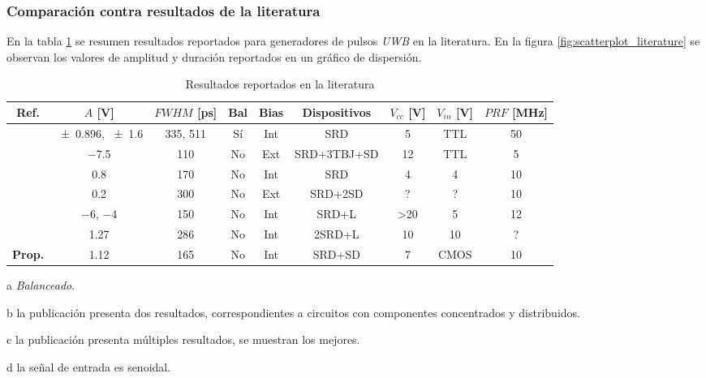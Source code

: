 \subsubsection{Comparación contra resultados de la literatura}

En la tabla \ref{tab:resultados_literatura} se resumen resultados reportados
para generadores de pulsos \textit{UWB} en la literatura. En la figura
\ref{fig:scatterplot_literature} se observan los valores de amplitud y duración
reportados en un gráfico de dispersión.

\begin{table}[t!]
    \begin{threeparttable}[b]
        {\footnotesize
            \begin{tabular}{ccccccccc}
                \hline
                Ref. & $A$ [\unit{\volt}] & $FWHM$ [\unit{\pico\second}] &
                Bal \tnote{a} & Bias & Dispositivos & $V_{cc}$ [\unit{\volt}] & $V_{in}$ [\unit{\volt}] & $PRF$ [\unit{\mega\hertz}] \\
                \hline
                \cite{rulikowski2004} & \num{\pm 0.896}, \num{\pm 1.6} \tnote{b} & 335, 511 & Sí & Int & SRD & 5 & TTL & 50 \\
                \cite{protiva2009} & \num{-7.5} & 110 & No & Ext & SRD+3TBJ+SD & 12 & TTL & 5 \\
                \cite{kamal2014} & \num{0.8} & 170 & No & Int & SRD & 4 & 4 & 10 \\
                \cite{han2002} & \num{0.2} & 300 & No & Ext & SRD+2SD & ? & ? & 10 \\
                \cite{han2005} & \num{-6}, \num{-4} & 150 & No & Int & SRD+L & >20 & 5 & 12 \\
                \cite{oloumi2018} & \num{1.27} \tnote{c} & 286 & No & Int & 2SRD+L & 10 & 10 \tnote{d} & ? \\
                \textbf{Prop.} & \num{1.12} & 165 & No & Int & SRD+SD & 7 & CMOS  &
                \num{10} \\
            \end{tabular}
        }
        \begin{tablenotes}
            \item [a] \textit{Balanceado}.
            \item [b] la publicación presenta dos resultados, correspondientes a
            circuitos con componentes concentrados y distribuidos.
            \item [c] la publicación presenta múltiples resultados, se muestran
            los mejores.
            \item [d] la señal de entrada es senoidal.
        \end{tablenotes}
    \end{threeparttable}
    \caption{Resultados reportados en la literatura}
    \label{tab:resultados_literatura}
\end{table}

